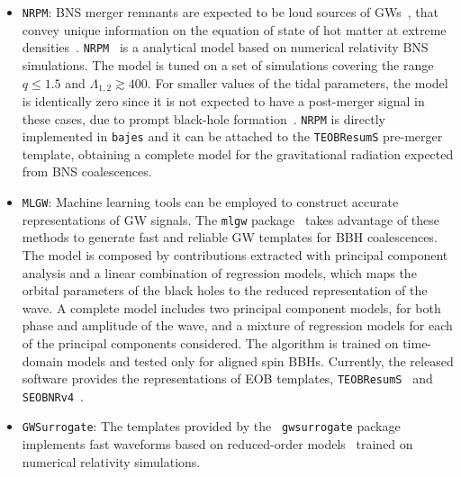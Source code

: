 \documentclass[prd,aps,twocolumn,a4paper,showkeys,nofootinbib,floatfix]{revtex4-1}
\newcommand{\bajes}{{\tt bajes}}
\newcommand{\py}{\textsc{Python}}
\begin{document}
\begin{itemize}
	hyperbolic encounters~\cite{Nagar:2020xsk}, 
	eccentric mergers~\cite{Chiaramello:2020ehz} and 
	a frequency domain approximation valid for
	quasi-circular BNS coalescences, labeled as {\tt TEOBResumSPA}~\cite{Gamba:2020ljo}.
        The model is publicly available at~\cite{teobresums}
        and used in {\bajes} from the provided {\py} interface.	 
      \item {\tt NRPM}: BNS merger remnants are expected to be loud sources of GWs~\cite{Takami:2014tva,Clark:2015zxa,Radice:2018xqa},
	that convey unique information on the equation of state of hot matter at extreme
	densities~\cite{Radice:2016rys,Radice:2017lry,Abbott:2018exr}. 
	{\tt NRPM}~\cite{Breschi:2019srl} is a analytical model based on numerical relativity BNS simulations.
	The model is tuned on a set of simulations covering the range $q\le 1.5$ and $\Lambda_{1,2} \gtrsim 400$.
	For smaller values of the tidal parameters, 
	the model is identically zero since it is not expected to have a post-merger signal in these cases, due to prompt black-hole formation~\cite{Zappa:2017xba,Agathos:2019sah,Bernuzzi:2020txg}.
	{\tt NRPM} is directly implemented in {\bajes} and
	it can be attached to the {\tt TEOBResumS} pre-merger template, 
	obtaining a complete model for the gravitational radiation
        expected from BNS coalescences.
      \item {\tt MLGW}: 
	Machine learning tools can be employed to construct
	accurate representations of GW signals.
	The {\tt mlgw} package~\cite{mlgw,Schmidt:2020yuu} takes advantage of these methods 
	 to generate fast and reliable GW templates for BBH coalescences.
	The model is composed by contributions extracted with
	principal component analysis
	and a linear combination of regression models, 
	which maps the orbital parameters of the black holes 
	to the reduced representation of the wave. 
	A complete model includes two principal component models,
	for both phase and amplitude of the wave, 
	and a mixture of regression models
	for each of the principal components considered. 
	The algorithm is trained on time-domain models
	and tested only for aligned spin BBHs. 
	Currently, the released software provides 
	the representations of EOB templates, {\tt TEOBResumS}~\cite{Nagar:2018zoe}
	and {\tt SEOBNRv4}~\cite{Bohe:2016gbl}.
      \item {\tt GWSurrogate}: The templates provided by the {\tt
        gwsurrogate} package~\cite{gwsur}
	implements fast waveforms based on reduced-order models~\cite{Field:2013cfa} 
	trained on numerical relativity simulations.

\end{itemize}
\end{document}
